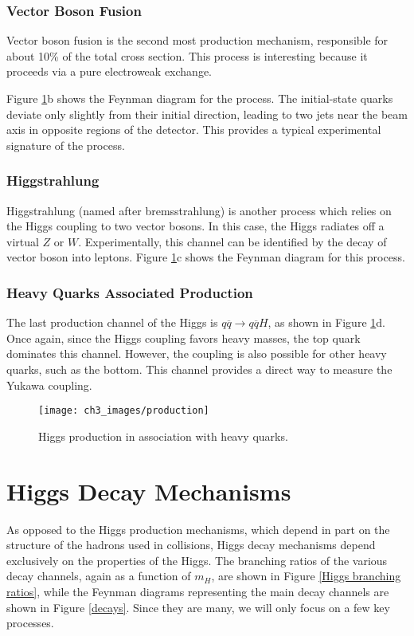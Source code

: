 \documentclass[10pt,a4paper]{book}
\begin{document}
\subsubsection{Vector Boson Fusion}
Vector boson fusion is the second most production mechanism, responsible for about 10\% of the total cross section. This process is interesting because it proceeds via a pure electroweak exchange. 

Figure \ref{production}b shows the Feynman diagram for the process. The initial-state quarks deviate only slightly from their initial direction, leading to two jets near the beam axis in opposite regions of the detector. This provides a typical experimental signature of the process. 


\subsubsection{Higgstrahlung}
Higgstrahlung (named after bremsstrahlung) is another process which relies on the Higgs coupling to two vector bosons. In this case, the Higgs radiates off a virtual $Z$ or $W$. Experimentally, this channel can be identified by the decay of vector boson into leptons. Figure \ref{production}c shows the Feynman diagram for this process.


\subsubsection{Heavy Quarks Associated Production}
The last production channel of the Higgs is $q\overline{q}\rightarrow q\overline{q}H$, as shown in Figure \ref{production}d. Once again, since the Higgs coupling favors heavy masses, the top quark dominates this channel. However, the coupling is also possible for other heavy quarks, such as the bottom. This channel provides a direct way to measure the Yukawa coupling.

\begin{figure}
\centering
\texttt{[image: ch3\_images/production]}
\caption{Higgs production in association with heavy quarks.}
\label{production}
\end{figure}

\section{Higgs Decay Mechanisms}
As opposed to the Higgs production mechanisms, which depend in part on the structure of the hadrons used in collisions, Higgs decay mechanisms depend exclusively on the properties of the Higgs. The branching ratios of the various decay channels, again as a function of $m_H$, are shown in Figure \ref{Higgs branching ratios}, while the Feynman diagrams representing the main decay channels are shown in Figure \ref{decays}. Since they are many, we will only focus on a few key processes.
\end{document}

